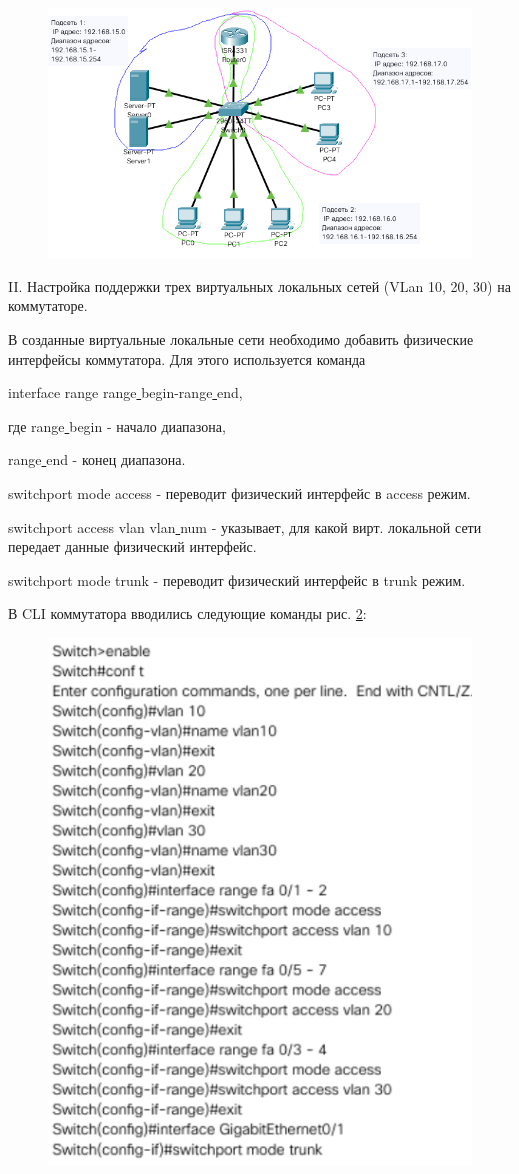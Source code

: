 \documentclass[a4paper,14pt]{extreport} %
\begin{document}
\begin{figure}[H]
	\centering
	\includegraphics[width=1\linewidth]{podseti}
	\caption{}
	\label{fig:podseti}
\end{figure}

II. Настройка поддержки трех виртуальных локальных сетей (VLan 10, 20, 30) на коммутаторе.

В созданные виртуальные локальные сети необходимо добавить физические интерфейсы коммутатора. Для этого используется команда 

interface range range\underline{ }begin-range\underline{ }end,

где range\underline{ }begin - начало диапазона, 

range\underline{ }end - конец диапазона.

switchport mode access - переводит физический интерфейс в access режим.

switchport access vlan vlan\underline{ }num - указывает, для какой вирт. локальной сети передает данные физический интерфейс.

switchport mode trunk - переводит физический интерфейс в trunk режим.

В CLI коммутатора вводились следующие команды рис. \ref{fig:2}:

\begin{figure}[H]
	\centering
	\includegraphics[width=0.7\linewidth]{2}
	\caption{}
	\label{fig:2}
\end{figure}
\end{document}
